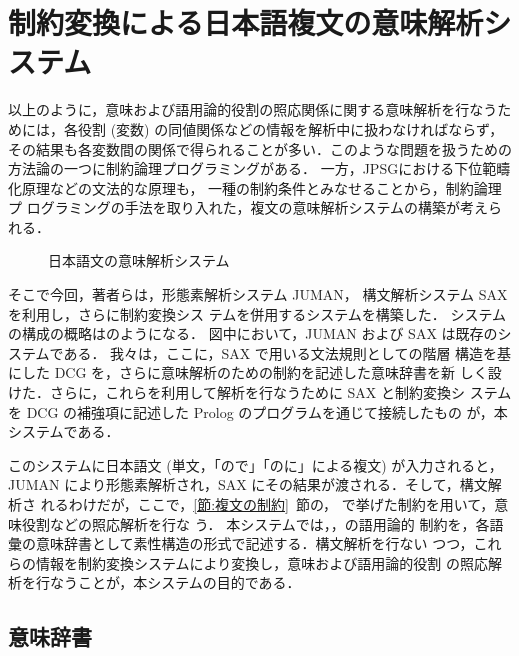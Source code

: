 \section{制約変換による日本語複文の意味解析システム}

以上のように，意味および語用論的役割の照応関係に関する意味解析を行なうた
めには，各役割 (変数) の同値関係などの情報を解析中に扱わなければならず，
その結果も各変数間の関係で得られることが多い．このような問題を扱うための
方法論の一つに制約論理プログラミングがある\cite{橋田:情報の部分性}．
一方，JPSG\cite{Gunji:JPSG}における下位範疇化原理などの文法的な原理も，
一種の制約条件とみなせることから\cite{郡司:制約に基づく文法}，制約論理プ
ログラミングの手法を取り入れた，複文の意味解析システムの構築が考えられる．

\begin{figure}[htbp]
\begin{center}
        
\end{center}
\caption{日本語文の意味解析システム}
\end{figure}

\iffalse
どの部分に語用論的制約を記述し，
どの様にしてそれを利用するか，について
ここで説明する．
\fi

そこで今回，著者らは，形態素解析システム JUMAN\cite{松本:NewJUMANmanual}，
構文解析システム SAX\cite{松本:NewSAXmanual}を利用し，さらに制約変換シス
テム\cite{森:否定情報の扱える制約システム}を併用するシステムを構築した．
システムの構成の概略はのようになる．
図中において，JUMAN および SAX は既存のシステムである．
我々は，ここに，SAX で用いる文法規則としての階層
構造を基にした DCG を，さらに意味解析のための制約を記述した意味辞書を新
しく設けた．さらに，これらを利用して解析を行なうために SAX と制約変換シ
ステムを DCG の補強項に記述した Prolog のプログラムを通じて接続したもの
が，本システムである．

このシステムに日本語文 (単文，「ので」「のに」による複文) が入力されると，
JUMAN により形態素解析され，SAX にその結果が渡される．そして，構文解析さ
れるわけだが，ここで，\ref{節:複文の制約}~節の，
で挙げた制約を用いて，意味役割などの照応解析を行な
う．
本システムでは，，の語用論的
制約を，各語彙の意味辞書として素性構造の形式で記述する．構文解析を行ない
つつ，これらの情報を制約変換システムにより変換し，意味および語用論的役割
の照応解析を行なうことが，本システムの目的である．

\subsection{意味辞書} \label{節:意味辞書}


